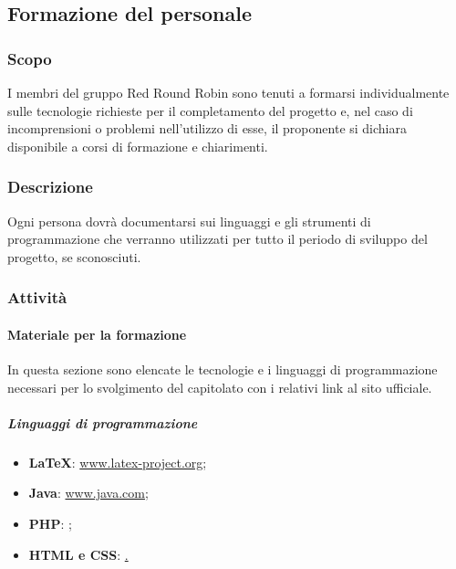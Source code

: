 \subsection{Formazione del personale}

	\subsubsection{Scopo}
		I membri del gruppo Red Round Robin sono tenuti a formarsi individualmente sulle tecnologie richieste per il completamento del progetto e, nel caso di incomprensioni o problemi nell'utilizzo di esse, il proponente si dichiara disponibile a corsi di formazione e chiarimenti.
		
	\subsubsection{Descrizione}
		Ogni persona dovrà documentarsi sui linguaggi e gli strumenti di programmazione che verranno utilizzati per tutto il periodo di sviluppo del progetto, se sconosciuti.
		
	\subsubsection{Attività}

		\paragraph{Materiale per la formazione}
		In questa sezione sono elencate le tecnologie e i linguaggi di programmazione necessari per lo svolgimento del capitolato con i relativi link al sito ufficiale.

		\subparagraph{Linguaggi di programmazione}

		\begin{itemize}
			\item \textbf{\LaTeX{}}: \href{https://www.latex-project.org}{www.latex-project.org};
			\item \textbf{Java}: \href{https://www.java.com/}{www.java.com};
			\item \textbf{PHP}: \href{https://www.php.net/manual/en/};
			\item \textbf{HTML e CSS}: \href{https://www.w3schools.com/}.
		\end{itemize}

